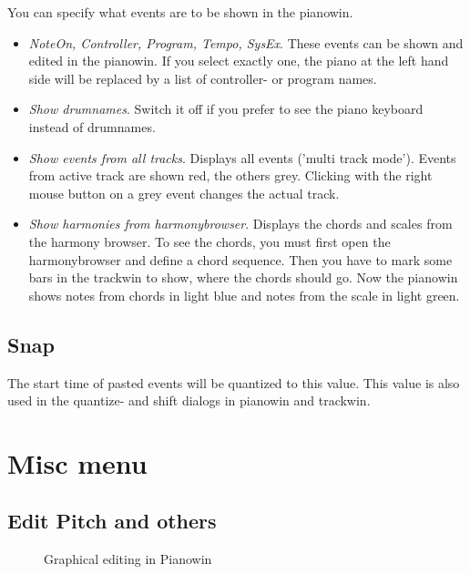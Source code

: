 \documentclass[letterpaper]{report}
\begin{document}
You can specify what events are to be shown in the pianowin.

\begin{itemize}
\item {\em NoteOn, Controller, Program, Tempo, SysEx}. These events can be
shown and
edited in the pianowin. If you select exactly one, the piano at the left
hand side will be replaced by a list of controller- or program names.
\item {\em Show drumnames}. Switch it off if you prefer to see the piano
keyboard instead of drumnames.
\item {\em Show events from all tracks}. Displays all events
('multi track mode'). Events from active track are shown
red, the others grey. Clicking with the right mouse button on a grey event
changes the actual track.
\item {\em Show harmonies from harmonybrowser}. Displays the chords and
scales from the harmony browser. To see the chords, you must first open the
harmonybrowser and define a chord sequence. Then you have to mark some bars
in the trackwin to show, where the chords should go. Now the pianowin shows
notes from chords in light blue and notes from the scale in light green.

\end{itemize}

\subsection{Snap}\label{snap}

The start time of pasted events will be quantized to this value. This value is also
used in the quantize- and shift dialogs in pianowin and trackwin.


\section{Misc menu}

\subsection{Edit Pitch and others}

\begin{figure}
\caption{Graphical editing in Pianowin}
\end{figure}
\end{document}
